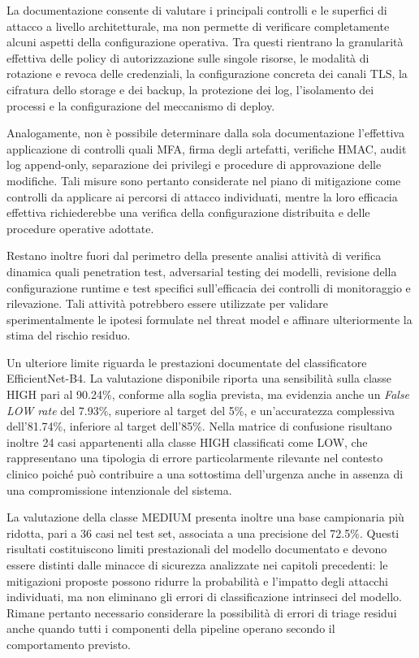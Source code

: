 La documentazione consente di valutare i principali controlli e le superfici di attacco a livello architetturale, ma non permette di verificare completamente alcuni aspetti della configurazione operativa. Tra questi rientrano la granularità effettiva delle policy di autorizzazione sulle singole risorse, le modalità di rotazione e revoca delle credenziali, la configurazione concreta dei canali TLS, la cifratura dello storage e dei backup, la protezione dei log, l'isolamento dei processi e la configurazione del meccanismo di deploy.

Analogamente, non è possibile determinare dalla sola documentazione l'effettiva applicazione di controlli quali MFA, firma degli artefatti, verifiche HMAC, audit log append-only, separazione dei privilegi e procedure di approvazione delle modifiche. Tali misure sono pertanto considerate nel piano di mitigazione come controlli da applicare ai percorsi di attacco individuati, mentre la loro efficacia effettiva richiederebbe una verifica della configurazione distribuita e delle procedure operative adottate.

Restano inoltre fuori dal perimetro della presente analisi attività di verifica dinamica quali penetration test, adversarial testing dei modelli, revisione della configurazione runtime e test specifici sull'efficacia dei controlli di monitoraggio e rilevazione. Tali attività potrebbero essere utilizzate per validare sperimentalmente le ipotesi formulate nel threat model e affinare ulteriormente la stima del rischio residuo.

Un ulteriore limite riguarda le prestazioni documentate del classificatore EfficientNet-B4. La valutazione disponibile riporta una sensibilità sulla classe HIGH pari al 90.24\%, conforme alla soglia prevista, ma evidenzia anche un \textit{False LOW rate} del 7.93\%, superiore al target del 5\%, e un'accuratezza complessiva dell'81.74\%, inferiore al target dell'85\%. Nella matrice di confusione risultano inoltre 24 casi appartenenti alla classe HIGH classificati come LOW, che rappresentano una tipologia di errore particolarmente rilevante nel contesto clinico poiché può contribuire a una sottostima dell'urgenza anche in assenza di una compromissione intenzionale
del sistema.

La valutazione della classe MEDIUM presenta inoltre una base campionaria più ridotta, pari a 36 casi nel test set, associata a una precisione del 72.5\%. Questi risultati costituiscono limiti prestazionali del modello documentato e devono essere distinti dalle minacce di sicurezza analizzate nei capitoli precedenti: le mitigazioni proposte possono ridurre la probabilità e l'impatto degli attacchi individuati, ma non eliminano gli errori di classificazione intrinseci del modello. Rimane pertanto necessario considerare la possibilità di errori di triage residui anche quando tutti i componenti della pipeline operano secondo il comportamento previsto.

